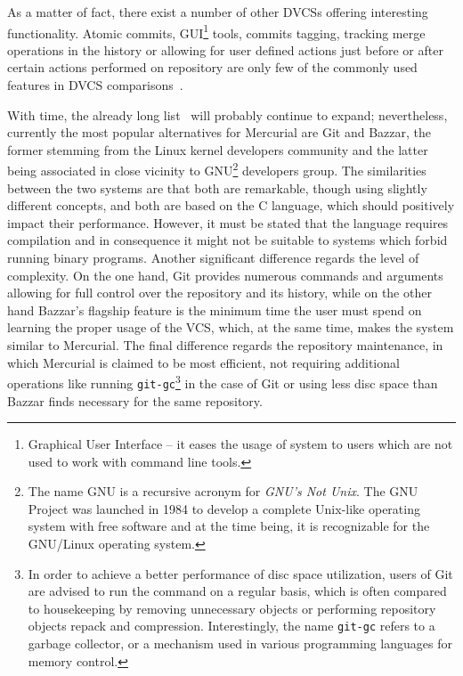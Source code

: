 As a matter of fact, there exist a number of other DVCSs offering interesting functionality. Atomic commits, GUI\footnote{Graphical User Interface -- it eases the usage of system to users which are not used to work with command line tools.} tools, commits tagging, tracking merge operations in the history or allowing for user defined actions just before or after certain actions performed on repository are only few of the commonly used features in DVCS comparisons~\cite{wiki_dvcs_compare}. 

With time, the already long list~\cite{wiki_dvcs_list} will probably continue to expand; nevertheless, currently the most popular alternatives for Mercurial are Git and Bazzar, the former stemming from the Linux kernel developers community and the latter being associated in close vicinity to GNU\footnote{The name GNU is a recursive acronym for \textit{GNU's Not Unix}. The GNU Project was launched in 1984 to develop a complete Unix-like operating system with free software and at the time being, it is recognizable for the GNU/Linux operating system.} developers group. The similarities between the two systems are that both are remarkable, though using slightly different concepts, and both are based on the C language, which should positively impact their performance. However, it must be stated that the language requires compilation and in consequence it might not be suitable to systems which forbid running binary programs. Another significant difference regards the level of complexity. On the one hand, Git provides numerous commands and arguments allowing for full control over the repository and its history, while on the other hand Bazzar's flagship feature is the minimum time the user must spend on learning the proper usage of the VCS, which, at the same time, makes the system similar to Mercurial. The final difference regards the repository maintenance, in which Mercurial is claimed to be most efficient, not requiring additional operations like running \texttt{git-gc}\footnote{In order to achieve a better performance of disc space utilization, users of Git are advised to run the command on a regular basis, which is often compared to housekeeping by removing unnecessary objects or performing repository objects repack and compression. Interestingly, the name \texttt{git-gc} refers to a garbage collector, or a mechanism used in various programming languages for memory control.} in the case of Git or using less disc space than Bazzar finds necessary for the same repository. 

